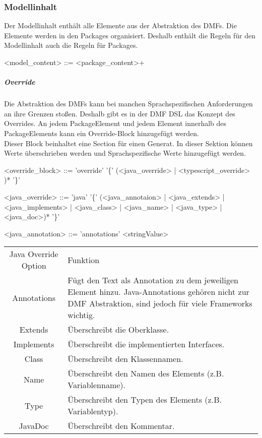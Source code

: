 \documentclass[./einleitung.tex]{subfiles}
\begin{document}
\subsubsection{Modellinhalt}
Der Modellinhalt enthält alle Elemente aus der Abstraktion des DMFs.
Die Elemente werden in den Packages organisiert. Deshalb enthält die Regeln für den Modellinhalt auch die Regeln für Packages.

\begin{grammar}
<model_content> ::= <package_content>+
\end{grammar}

\subparagraph{Override}
Die Abstraktion des DMFs kann bei manchen Sprachspezifischen Anforderungen an ihre Grenzen stoßen. Deshalb gibt es in der DMF DSL das Konzept des Overrides. An jedem PackageElement und jedem Element innerhalb des PackageElements kann ein Override-Block hinzugefügt werden. \\
Dieser Block beinhaltet eine Section für einen Generat. In dieser Sektion können Werte überschrieben werden und Sprachspezifische Werte hinzugefügt werden. \\ 
\begin{grammar}
<override_block> ::= 'override' '\{' (<java_override> | <typescript_override> )* '\}'

<java_override> ::= 'java' '\{' (<java_annotaion> | <java_extends> | <java_implements> | <java_class> | <java_name> | <java_type> | <java_doc>)* '\}'

<java_annotation> ::= 'annotations' <stringValue>
\end{grammar}
\begin{center}
\begin{tabular}{| c || m{30em} |}
\hline
Java Override Option & Funktion\\
\hhline{|=||=|}
Annotations & Fügt den Text als Annotation zu dem jeweiligen Element hinzu. Java-Annotations gehören nicht zur DMF Abstraktion, sind jedoch für viele Frameworks wichtig.\\
\hline
Extends & Überschreibt die Oberklasse.\\
\hline
Implements & Überschreibt die implementierten Interfaces.\\
\hline
Class & Überschreibt den Klassennamen.\\
\hline
Name & Überschreibt den Namen des Elements (z.B. Variablenname).\\
\hline
Type & Überschreibt den Typen des Elements (z.B. Variablentyp).\\
\hline
JavaDoc & Überschreibt den Kommentar.\\
\hline
\end{tabular}
\end{center}
\end{document}

